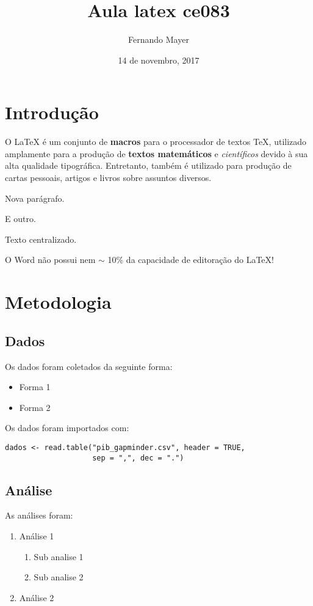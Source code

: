 \documentclass[a4paper]{article}
\title{Aula latex ce083}
\author{Fernando Mayer}
\date{14 de novembro, 2017}
\begin{document}
\maketitle
\tableofcontents

\section{Introdução}

O LaTeX é um conjunto de {\bf macros} para o processador de textos TeX, utilizado amplamente para a produção de \textbf{textos matemáticos} e \textit{científicos} devido à sua alta qualidade tipográfica. Entretanto, também é utilizado para produção
de cartas pessoais, artigos e {\Large livros} sobre assuntos diversos.

Nova parágrafo.

E outro.

\begin{center}
Texto centralizado.
\end{center}

O Word não possui nem $\sim$ 10\% da capacidade de editoração do LaTeX!

\section{Metodologia}

\subsection{Dados}

Os dados foram coletados da seguinte forma:

\begin{itemize}
\item Forma 1
\item Forma 2
\end{itemize}

Os dados foram importados com:

\begin{verbatim}
dados <- read.table("pib_gapminder.csv", header = TRUE,
                    sep = ",", dec = ".")
\end{verbatim}

\subsection{Análise}

As análises foram:

\begin{enumerate}
\item Análise 1
\begin{enumerate}
\item Sub analise 1
\item Sub analise 2
\end{enumerate}
\item Análise 2
\end{enumerate}
\end{document}
